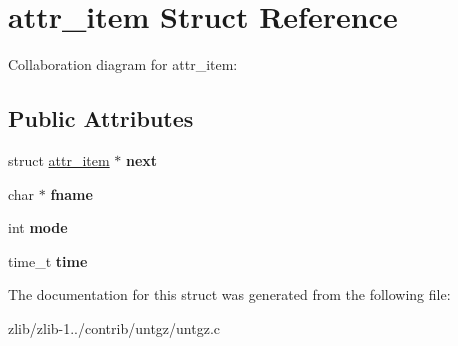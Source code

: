 \hypertarget{structattr__item}{\section{attr\+\_\+item Struct Reference}
\label{structattr__item}
}


Collaboration diagram for attr\+\_\+item\+:
\subsection*{Public Attributes}
\begin{DoxyCompactItemize}
\item 
\hypertarget{structattr__item_a428c1e79bd486be793c36b9f02c0c2d7}{struct \hyperlink{structattr__item}{attr\+\_\+item} $\ast$ {\bfseries next}}\label{structattr__item_a428c1e79bd486be793c36b9f02c0c2d7}

\item 
\hypertarget{structattr__item_a0fdc225529fc59069cfa777b7f7d3562}{char $\ast$ {\bfseries fname}}\label{structattr__item_a0fdc225529fc59069cfa777b7f7d3562}

\item 
\hypertarget{structattr__item_a2a7463d7c3b23ae7ca0b83c9863a3f8c}{int {\bfseries mode}}\label{structattr__item_a2a7463d7c3b23ae7ca0b83c9863a3f8c}

\item 
\hypertarget{structattr__item_a24d9a9df84ea95659d31ee9d16e2b4b1}{time\+\_\+t {\bfseries time}}\label{structattr__item_a24d9a9df84ea95659d31ee9d16e2b4b1}

\end{DoxyCompactItemize}


The documentation for this struct was generated from the following file\+:\begin{DoxyCompactItemize}
\item 
zlib/zlib-\/1../contrib/untgz/untgz.\+c\end{DoxyCompactItemize}
